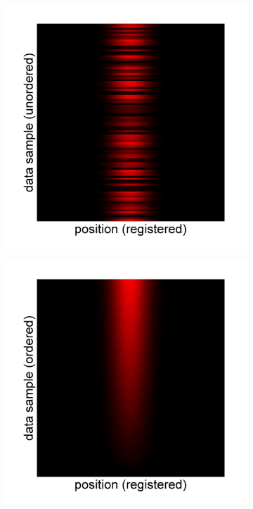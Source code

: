 \documentclass{pnastwo}
\begin{document}
\begin{figure}
\begin{subfigure}{0.2\textwidth}
\caption{}
\label{subfig:1d_unaligned_unordered}
\end{subfigure}
\begin{subfigure}{0.2\textwidth}
\includegraphics[width=\textwidth]{registered_unordered_toy}
\caption{}
\label{subfig:1d_aligned_unordered}
\end{subfigure}
\begin{subfigure}{0.2\textwidth}
\includegraphics[width=\textwidth]{registered_ordered_toy}

\end{subfigure}
\end{figure}
\end{document}
